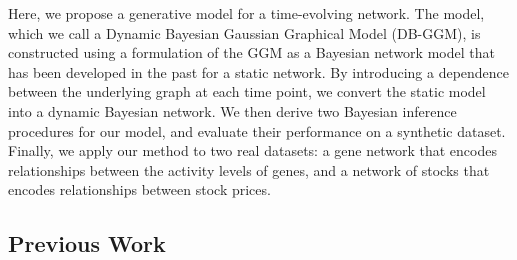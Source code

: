 \documentclass{article}
\begin{document}


Here, we propose a generative model for a time-evolving network. The model, which we call a Dynamic Bayesian Gaussian Graphical Model (DB-GGM), is constructed using a formulation of the GGM as a Bayesian network model that has been developed in the past for a static network. By introducing a dependence between the underlying graph at each time point, we convert the static model into a dynamic Bayesian network. We then derive two Bayesian inference procedures for our model, and evaluate their performance on a synthetic dataset. Finally, we apply our method to two real datasets: a gene network that encodes relationships between the activity levels of genes, and a network of stocks that encodes relationships between stock prices.

\subsection{Previous Work}
\label{sec:prev-work}
\end{document}
